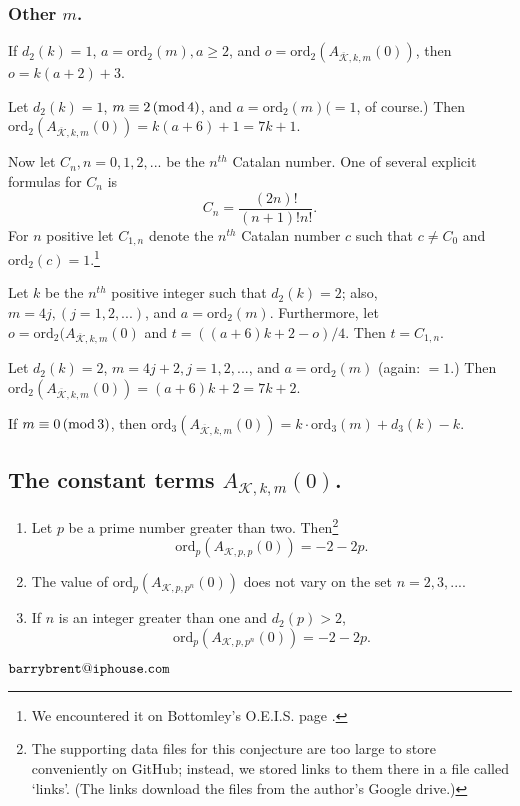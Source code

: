 \documentclass{article}
\begin{document}
\subsubsection[]{Other $m$.}
\begin{conjecture}
If $d_2(k) = 1$, 
$a = \text{ord}_2(m), 
a \geq 2$, and
$o = \text{ord}_2 (A_{\overline{\mathcal{K}},k,m}(0))$,
then $o=k(a+2)+3$.
\end{conjecture}
\begin{conjecture} 
Let $d_2(k) = 1$,
$m \equiv 2 \thinspace 
(\text{mod} \thinspace 4)$,
and $a=\text{ord}_2(m) ( = 1$,
of course.)
Then 
$\text{ord}_2 (A_{\overline{\mathcal{K}},k,m}(0)) =
k(a+6) + 1 = 7k + 1$.
\end{conjecture} \noindent
Now let $C_n, n = 0, 1, 2, ...$ be 
the $n^{th}$ Catalan number. 
One of several explicit formulas 
for $C_n$ is $$C_n = 
\frac{(2n)!}{(n+1)!n!}.$$ \noindent
For $n$ positive
let  $C_{1,n}$ denote the $n^{th}$ 
Catalan number $c$ such that $c \neq C_0$ and $\text{ord}_2(c) = 1$.\footnote{We 
 encountered 
 it on Bottomley's O.E.I.S. page 
\cite{OEISbottomley}.}
\begin{conjecture}
Let 
$k$ be the $n^{th}$ positive integer
such that
$d_2(k) = 2$; also,
$m = 4j, (j = 1, 2,...)$,
and
$a = \text{ord}_2(m)$.
Furthermore, let
$o = \text{ord}_2 (A_{\overline{\mathcal{K}},k,m}(0)$ and 
$ t = ((a+6)k +2 - o)/4$.
Then 
$t = C_{1,n}$.
\end{conjecture}
\begin{conjecture}
Let  $d_2(k) = 2$,
$m = 4j + 2, j = 1, 2, ...$, and 
$a = \text{ord}_2(m)$ (again: $ = 1$.)
Then
$\text{ord}_2 
(A_{\overline{\mathcal{K}},k,m}(0)) = (a+6)k+2
= 7k + 2$.
\end{conjecture}
\begin{conjecture} If
$m \equiv 0 \thinspace 
(\text{mod} \thinspace 3)$,
then $\text{ord}_3 (A_{\overline{\mathcal{K}},k,m}(0))=
k \cdot \text{ord}_3(m) + d_3(k) - k.$
\end{conjecture}
\subsection[]{The constant terms $A_{\mathcal{K},k,m}(0)$.
} 
\begin{conjecture}
\begin{enumerate}
\item
 Let $p$ be a prime number greater than two.
Then\footnote{The supporting data files
for this conjecture are too large to store
conveniently on GitHub; instead, we stored
links to them there in a file
called `links'.\cite{githubNewmanShanks} (The links download the files from the author's Google 
drive.)}
$$\text{ord}_p(A_{\mathcal{K},p,p}(0)) = 
-2 - 2p.$$
\item The value of $\text{ord}_p(A_{\mathcal{K},p,p^n}(0))$
does not vary on the set $n = 2, 3, ...$.
\item  If $n$ is an integer greater than one
and $d_2(p)>2$, 
$$\text{ord}_p(A_{\mathcal{K},p,p^n}(0)) = 
-2 - 2p.$$
\end{enumerate}
\end{conjecture}
\printbibliography
$\tt{barrybrent@iphouse.com}$
\end{document}
